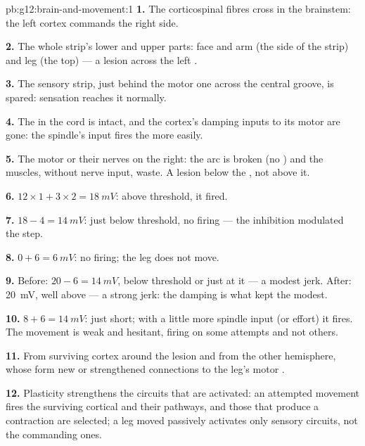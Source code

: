 \begin{solution}{pb:g12:brain-and-movement:1}
\textbf{1.} The corticospinal fibres cross in the brainstem: the left
cortex commands the right side.

\textbf{2.} The whole strip's lower and upper parts: face and arm (the
side of the strip) and leg (the top) --- a lesion across the left
.

\textbf{3.} The sensory strip, just behind the motor one across the
central groove, is spared: sensation reaches it normally.

\textbf{4.} The  in the cord is intact, and the cortex's
damping inputs to its motor  are gone: the spindle's input
fires the  more easily.

\textbf{5.} The motor  or their nerves on the right: the arc is
broken (no ) and the muscles, without nerve input, waste. A
lesion below the , not above it.

\textbf{6.} $12 \times 1 + 3 \times 2 = \qty{18}{mV}$: above threshold,
it fired.

\textbf{7.} $18 - 4 = \qty{14}{mV}$: just below threshold, no firing
--- the inhibition modulated the step.

\textbf{8.} $0 + 6 = \qty{6}{mV}$: no firing; the leg does not move.

\textbf{9.} Before: $20 - 6 = \qty{14}{mV}$, below threshold or just at
it --- a modest jerk. After: \qty{20}{mV}, well above --- a strong jerk:
the damping is what kept the  modest.

\textbf{10.} $8 + 6 = \qty{14}{mV}$: just short; with a little more
spindle input (or effort) it fires. The movement is weak and
hesitant, firing on some attempts and not others.

\textbf{11.} From surviving cortex around the lesion and from the
other hemisphere, whose  form new or strengthened connections
to the leg's motor .

\textbf{12.} Plasticity strengthens the circuits that are activated:
an attempted movement fires the surviving cortical  and their
pathways, and those that produce a contraction are selected; a leg
moved passively activates only sensory circuits, not the commanding
ones.


\end{solution}

